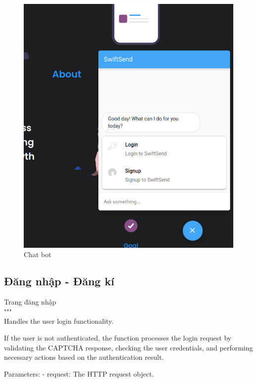 \documentclass[paper=a4wide, fontsize=12pt]{scrartcl}	 %
\begin{document}
\begin{figure}[H]
    \centering
    \includegraphics[scale=0.7]{demo/chat.png}
    \caption{Chat bot}
\end{figure}

\subsection{Đăng nhập - Đăng kí}
Trang đăng nhập \\

""" \\
Handles the user login functionality.

If the user is not authenticated, the function processes the login request by validating the CAPTCHA response,
checking the user credentials, and performing necessary actions based on the authentication result.

Parameters:
- request: The HTTP request object.
\end{document}
